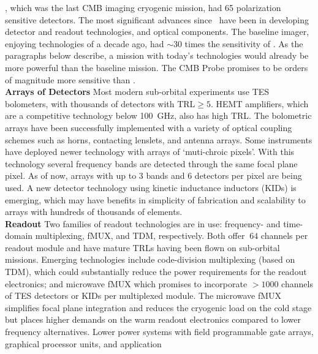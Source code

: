 \planck, which was the last CMB imaging cryogenic mission, had 65 polarization sensitive detectors. 
The most significant advances since \planck~have been in developing detector and readout technologies, and optical components.
The baseline imager, enjoying technologies of a decade ago, had $\sim$30 times the sensitivity of \planck.  
As the paragraphs below describe, a mission with today's technologies would already be 
more powerful than the baseline mission.  The CMB Probe promises to be orders of magnitude more 
sensitive than \planck.  \\
{\bf Arrays of Detectors} \hspace{0.1in} 
Most modern sub-orbital experiments use TES bolometers, with thousands of detectors with TRL$\geq 5$. 
HEMT amplifiers, which are a competitive technology below 100~GHz, also has high TRL.   
The bolometric arrays have been successfully implemented with a variety of optical coupling schemes such as horns, 
contacting lenslets, and antenna arrays. Some instruments have deployed newer technology with arrays of `muti-chroic pixels'. 
With this technology several frequency bands are detected through the same focal plane pixel. As of now, arrays with up 
to 3 bands and 6 detectors per pixel are being used. 
A new detector technology using kinetic inductance inductors (KIDs) is emerging, which may have benefits in simplicity 
of fabrication and scalability to arrays with hundreds of thousands of elements.  \\
{\bf Readout }  \hspace{0.1in} Two families of readout technologies are in use: frequency- and time-domain multiplexing, 
fMUX, and TDM, respectively.  Both offer $~64$ channels per readout module and have mature TRLs having been 
flown on sub-orbital missions.   Emerging technologies include code-division multiplexing (based on TDM), which could 
substantially reduce the power requirements for the readout electronics; and microwave fMUX which promises to 
incorporate $>1000$ channels of TES detectors or KIDs per multiplexed module. The microwave fMUX simplifies 
focal plane integration and reduces the cryogenic load on the cold stage but places higher 
demands on the warm readout electronics compared to lower frequency alternatives. 
Lower power systems with field programmable gate arrays, graphical processor units, and application 
